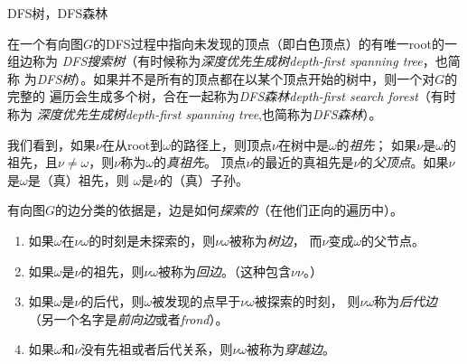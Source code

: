 \begin{definition}\label{Def:DFSTree_and_DFSForest}
DFS树，DFS森林

在一个有向图$G$的DFS过程中指向未发现的顶点（即白色顶点）的有唯一root的一组边称为
\emph{DFS搜索树}（有时候称为\emph{深度优先生成树depth-first spanning tree}，也简称
为\emph{DFS树}）。如果并不是所有的顶点都在以某个顶点开始的树中，则一个对$G$的完整的
遍历会生成多个树，合在一起称为\emph{DFS森林depth-first search forest}（有时称为
\emph{深度优先生成树depth-first spanning tree},也简称为\emph{DFS森林}）。
\end{definition}

\begin{definition}\mbox{}\par

我们看到，如果$\nu$在从root到$\omega$的路径上，则顶点$\nu$在树中是$\omega$的\emph{祖先}；
如果$\nu$是$\omega$的祖先，且$\nu\neq\omega$，则$\nu$称为$\omega$的\emph{真祖先}。
顶点$\nu$的最近的真祖先是$\nu$的\emph{父顶点}。如果$\nu$是$\omega$是（真）祖先，则
$\omega$是$\nu$的（真）子孙。
\end{definition}

\begin{definition}\mbox{}\par
有向图$G$的边分类的依据是，边是如何\emph{探索的}（在他们正向的遍历中）。
\begin{enumerate}
\item 如果$\omega$在$\nu\omega$的时刻是未探索的，则$\nu\omega$被称为\emph{树边}，
而$\nu$变成$\omega$的父节点。

\item 如果$\omega$是$\nu$的祖先，则$\nu\omega$被称为\emph{回边}。（这种包含$\nu\nu$。）

\item 如果$\omega$是$\nu$的后代，则$\omega$被发现的点早于$\nu\omega$被探索的时刻，
则$\nu\omega$称为\emph{后代边}（另一个名字是\emph{前向边}或者\emph{frond}）。

\item 如果$\omega$和$\nu$没有先祖或者后代关系，则$\nu\omega$被称为\emph{穿越边}。
\end{enumerate}
\end{definition}

